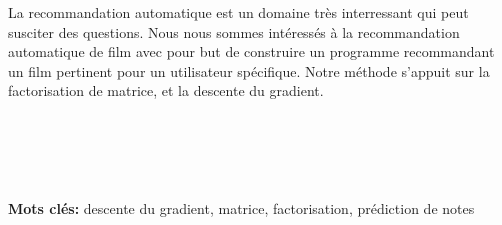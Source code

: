\documentclass[a4paper,10pt]{article}
\begin{document}
La recommandation automatique est un domaine très interressant qui peut susciter des questions. Nous nous sommes intéressés à la recommandation
automatique de film avec pour but de construire un programme recommandant un film pertinent pour un utilisateur spécifique. Notre méthode s'appuit 
sur la factorisation de matrice, et la descente du gradient.\\ \\ \\ \\ \\ \\

\textbf{{Mots clés:}} descente du gradient, matrice, factorisation, prédiction de notes %
\end{document}
